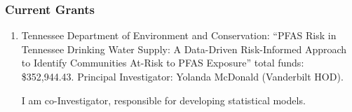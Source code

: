 %
%
\iffalse
\else
\subsubsection{Current Grants}

\begin{enumerate}
	\item Tennessee Department of Environment and Conservation:
	``PFAS Risk in Tennessee Drinking Water Supply: A Data-Driven Risk-Informed Approach to Identify Communities At-Risk to PFAS Exposure''
	total funds: \$352,944.43.
	Principal Investigator: Yolanda McDonald (Vanderbilt HOD).
\begin{credit}
  I am co-Investigator, responsible for developing statistical models.
\end{credit}
%
\end{enumerate}
\fi
%
\iffalse
\subsubsection{Pending Grant Proposals}
\else
\fi
%
